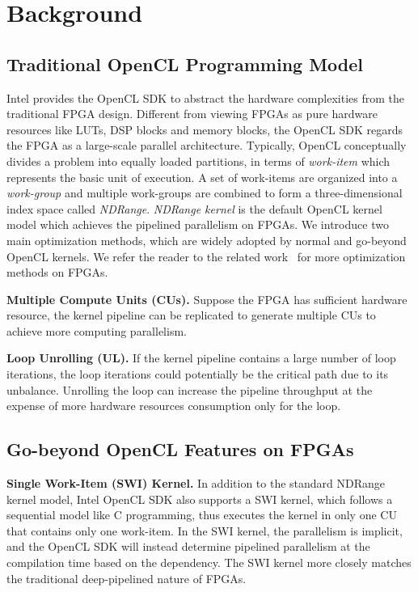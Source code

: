 \section{Background}

\vspace{-1ex}
\subsection{Traditional OpenCL Programming Model}
Intel provides the OpenCL SDK to abstract the hardware complexities from the traditional FPGA design.
Different from viewing FPGAs as pure hardware resources like LUTs, DSP blocks and memory blocks, the OpenCL SDK regards the FPGA as a large-scale parallel architecture. Typically, OpenCL conceptually divides a problem into equally loaded partitions, in terms of \emph{work-item} which represents the basic unit of execution. A set of work-items are organized into a \emph{work-group} and multiple work-groups are combined to form a three-dimensional index space called \emph{NDRange}. \emph{NDRange kernel} is the default OpenCL kernel model which achieves the pipelined parallelism on FPGAs. 
We introduce two main optimization methods, which are widely adopted by normal and go-beyond OpenCL kernels. We refer the reader to the related work~\cite{fpga_opencl_model_hpca16, opencl_hpc_sc16} for more optimization methods on FPGAs. 

{\bf Multiple Compute Units (CUs). } Suppose the FPGA has sufficient hardware resource, the kernel pipeline can be replicated to generate multiple CUs to achieve more computing parallelism. 

{\bf Loop Unrolling (UL). } If the kernel pipeline contains a large number of loop iterations, the loop iterations could potentially be the critical path due to its unbalance. Unrolling the loop can increase the pipeline throughput at the expense of more hardware resources consumption only for the loop. %


\vspace{-1ex}
\subsection{Go-beyond OpenCL Features on FPGAs}

{\bf Single Work-Item (SWI) Kernel. } 
In addition to the standard NDRange kernel model, Intel OpenCL SDK also supports a SWI kernel, which follows a sequential model like C programming, thus executes the kernel in only one CU that contains only one work-item. In the SWI kernel, the parallelism is implicit, and the OpenCL SDK will instead determine pipelined parallelism at the compilation time based on the dependency. The SWI kernel more closely matches the traditional deep-pipelined nature of FPGAs.


